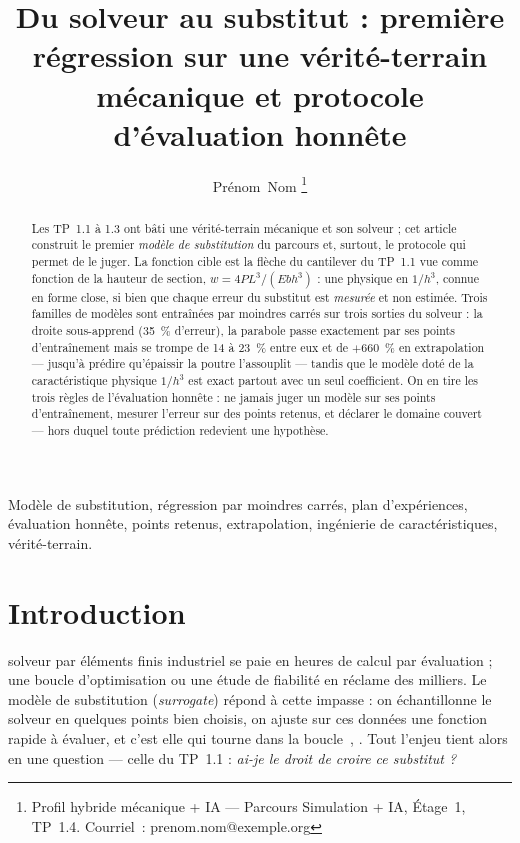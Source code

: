 \documentclass[10pt,journal]{IEEEtran}
\begin{document}
\title{Du solveur au substitut : première régression sur une vérité-terrain mécanique et protocole d'évaluation honnête}

\author{Prénom~Nom%
\thanks{Profil hybride mécanique + IA --- Parcours Simulation + IA, Étage~1, TP~1.4. Courriel~: prenom.nom@exemple.org}}


\maketitle

\begin{abstract}
Les TP~1.1 à 1.3 ont bâti une vérité-terrain mécanique et son solveur ; cet article construit le premier \emph{modèle de substitution} du parcours et, surtout, le protocole qui permet de le juger. La fonction cible est la flèche du cantilever du TP~1.1 vue comme fonction de la hauteur de section, $w = 4PL^3/(Ebh^3)$ : une physique en $1/h^3$, connue en forme close, si bien que chaque erreur du substitut est \emph{mesurée} et non estimée. Trois familles de modèles sont entraînées par moindres carrés sur trois sorties du \og solveur\fg{} : la droite sous-apprend (35~\% d'erreur), la parabole passe exactement par ses points d'entraînement mais se trompe de 14 à 23~\% entre eux et de $+660$~\% en extrapolation --- jusqu'à prédire qu'épaissir la poutre l'assouplit --- tandis que le modèle doté de la caractéristique physique $1/h^3$ est exact partout avec un seul coefficient. On en tire les trois règles de l'évaluation honnête : ne jamais juger un modèle sur ses points d'entraînement, mesurer l'erreur sur des points retenus, et déclarer le domaine couvert --- hors duquel toute prédiction redevient une hypothèse.
\end{abstract}

\begin{IEEEkeywords}
Modèle de substitution, régression par moindres carrés, plan d'expériences, évaluation honnête, points retenus, extrapolation, ingénierie de caractéristiques, vérité-terrain.
\end{IEEEkeywords}

\IEEEpeerreviewmaketitle

\section{Introduction}
 solveur par éléments finis industriel se paie en heures de calcul par évaluation ; une boucle d'optimisation ou une étude de fiabilité en réclame des milliers. Le modèle de substitution (\emph{surrogate}) répond à cette impasse : on échantillonne le solveur en quelques points bien choisis, on ajuste sur ces données une fonction rapide à évaluer, et c'est elle qui tourne dans la boucle~\cite{forrester}, \cite{sacks}. Tout l'enjeu tient alors en une question --- celle du TP~1.1 : \emph{ai-je le droit de croire ce substitut ?}
\end{document}
